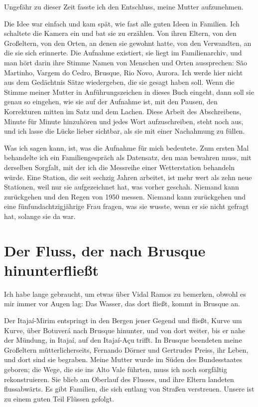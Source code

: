 \documentclass[
  ngerman,
  11pt,
  openany]{book}
\begin{document}
Ungefähr zu dieser Zeit fasste ich den Entschluss, meine Mutter
aufzunehmen.

Die Idee war einfach und kam spät, wie fast alle guten Ideen in
Familien. Ich schaltete die Kamera ein und bat sie zu erzählen. Von
ihren Eltern, von den Großeltern, von den Orten, an denen sie gewohnt
hatte, von den Verwandten, an die sie sich erinnerte. Die Aufnahme
existiert, sie liegt im Familienarchiv, und man hört darin ihre Stimme
Namen von Menschen und Orten aussprechen: São Martinho, Vargem do Cedro,
Brusque, Rio Novo, Aurora. Ich werde hier nicht aus dem Gedächtnis Sätze
wiedergeben, die sie gesagt haben soll. Wenn die Stimme meiner Mutter in
Anführungszeichen in dieses Buch eingeht, dann soll sie genau so
eingehen, wie sie auf der Aufnahme ist, mit den Pausen, den Korrekturen
mitten im Satz und dem Lachen. Diese Arbeit des Abschreibens, Minute für
Minute hinzuhören und jedes Wort aufzuschreiben, steht noch aus, und ich
lasse die Lücke lieber sichtbar, als sie mit einer Nachahmung zu füllen.

Was ich sagen kann, ist, was die Aufnahme für mich bedeutete. Zum ersten
Mal behandelte ich ein Familiengespräch als Datensatz, den man bewahren
muss, mit derselben Sorgfalt, mit der ich die Messreihe einer
Wetterstation behandeln würde. Eine Station, die seit sechzig Jahren
arbeitet, ist mehr wert als zehn neue Stationen, weil nur sie
aufgezeichnet hat, was vorher geschah. Niemand kann zurückgehen und den
Regen von 1950 messen. Niemand kann zurückgehen und eine
fünfundachtzigjährige Frau fragen, was sie wusste, wenn er sie nicht
gefragt hat, solange sie da war.

\section{Der Fluss, der nach Brusque
hinunterfließt}\label{der-fluss-der-nach-brusque-hinunterflieuxdft}

Ich habe lange gebraucht, um etwas über Vidal Ramos zu bemerken, obwohl
es mir immer vor Augen lag: Das Wasser, das dort fließt, kommt in
Brusque an.

Der Itajaí-Mirim entspringt in den Bergen jener Gegend und fließt, Kurve
um Kurve, über Botuverá nach Brusque hinunter, und von dort weiter, bis
er nahe der Mündung, in Itajaí, auf den Itajaí-Açu trifft. In Brusque
beendeten meine Großeltern mütterlicherseits, Fernando Dörner und
Gertrudes Preiss, ihr Leben, und dort sind sie begraben. Meine Mutter
wurde im Süden des Bundesstaates geboren; die Wege, die sie ins Alto
Vale führten, muss ich noch sorgfältig rekonstruieren. Sie blieb am
Oberlauf des Flusses, und ihre Eltern landeten flussabwärts. Es gibt
Familien, die sich entlang von Straßen verstreuen. Unsere ist zu einem
guten Teil Flüssen gefolgt.
\end{document}
